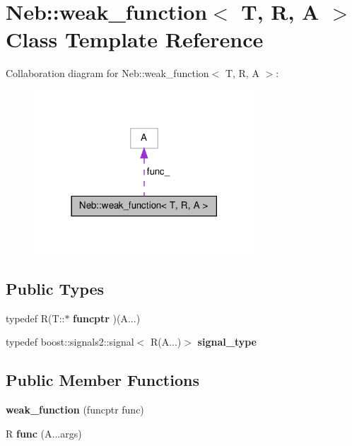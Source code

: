 \hypertarget{classNeb_1_1weak__function}{\section{\-Neb\-:\-:weak\-\_\-function$<$ \-T, \-R, \-A $>$ \-Class \-Template \-Reference}
\label{classNeb_1_1weak__function}
}


\-Collaboration diagram for \-Neb\-:\-:weak\-\_\-function$<$ \-T, \-R, \-A $>$\-:\nopagebreak
\begin{figure}[H]
\begin{center}
\leavevmode
\includegraphics[width=234pt]{classNeb_1_1weak__function__coll__graph}
\end{center}
\end{figure}
\subsection*{\-Public \-Types}
\begin{DoxyCompactItemize}
\item 
\hypertarget{classNeb_1_1weak__function_ae1907cb79bcd88603d11bb7fea734b8c}{typedef \-R(\-T\-::$\ast$ {\bfseries funcptr} )(\-A...)}\label{classNeb_1_1weak__function_ae1907cb79bcd88603d11bb7fea734b8c}

\item 
\hypertarget{classNeb_1_1weak__function_a46d7f953b289ec9292937a4e7082abd0}{typedef \*
boost\-::signals2\-::signal$<$ \-R(\-A...)$>$ {\bfseries signal\-\_\-type}}\label{classNeb_1_1weak__function_a46d7f953b289ec9292937a4e7082abd0}

\end{DoxyCompactItemize}
\subsection*{\-Public \-Member \-Functions}
\begin{DoxyCompactItemize}
\item 
\hypertarget{classNeb_1_1weak__function_a748cd930266832c1116f6a31e27ab484}{{\bfseries weak\-\_\-function} (funcptr func)}\label{classNeb_1_1weak__function_a748cd930266832c1116f6a31e27ab484}

\item 
\hypertarget{classNeb_1_1weak__function_afd7f9127a6a12e347f0e4594360c884c}{\-R {\bfseries func} (\-A...\-args)}\label{classNeb_1_1weak__function_afd7f9127a6a12e347f0e4594360c884c}

\end{DoxyCompactItemize}
